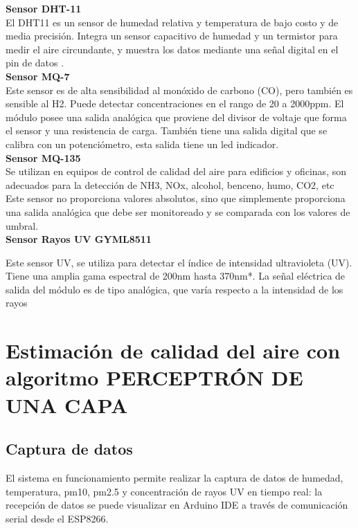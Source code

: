 \documentclass[10pt,a4paper]{article}
\begin{document}
\textbf{Sensor DHT-11}\\

El DHT11 es un sensor de humedad relativa y temperatura de bajo costo y de media precisión. Integra un sensor capacitivo de humedad y un termistor para medir el aire circundante, y muestra los datos mediante una señal digital en el pin de datos . \\

\textbf{Sensor MQ-7}\\

Este sensor es de alta sensibilidad al monóxido de carbono (CO), pero también es sensible al H2.  Puede detectar concentraciones en el rango de 20 a 2000ppm.
El módulo posee una salida analógica que proviene del divisor de voltaje que forma el sensor y una resistencia de carga. También tiene una salida digital que se calibra con un potenciómetro, esta salida tiene un led indicador.\\

\textbf{Sensor MQ-135}\\

Se utilizan en equipos de control de calidad del aire para edificios y oficinas, son adecuados para la detección de NH3, NOx, alcohol, benceno, humo, CO2, etc
Este sensor no proporciona valores absolutos, sino que simplemente proporciona una salida analógica que debe ser monitoreado y se comparada con los valores de umbral.\\

\textbf {Sensor Rayos UV GYML8511}

Este sensor UV, se utiliza para detectar el índice de intensidad ultravioleta (UV). Tiene una amplia gama espectral de 200nm hasta 370nm*. La señal eléctrica de salida del módulo es de tipo analógica, que varía respecto a la intensidad de los rayos \\

\section{Estimación de calidad del aire con algoritmo PERCEPTRÓN DE UNA CAPA }
\subsection{Captura de datos}

El sistema en funcionamiento permite realizar la captura de datos de humedad, temperatura, pm10, pm2.5 y concentración de rayos UV en tiempo real: la recepción de datos se puede visualizar en Arduino IDE a través de comunicación serial desde el ESP8266.\\
\end{document}
